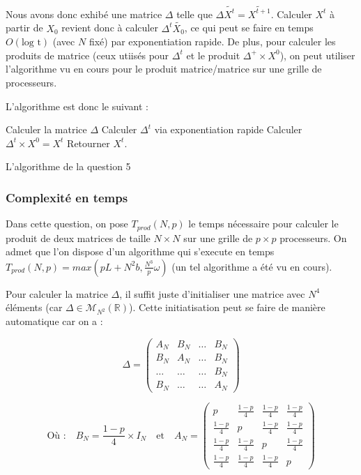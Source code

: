 \documentclass{article}
\begin{document}
Nous avons donc exhibé une matrice $\Delta$ telle que $\Delta \widetilde{X^t} = \widetilde{X^{t+1}}$. Calculer $X^t$ à partir de $X_0$ revient donc à calculer $\Delta^t \widetilde{X_0}$, ce qui peut se faire en temps $O(\text{log t})$ (avec $N$ fixé) par exponentiation rapide. De plus, pour calculer les produits de matrice (ceux utiisés pour $\Delta^t$ et le produit $\Delta^+ \times X^0$), on peut utiliser l'algorithme vu en cours pour le produit matrice/matrice sur une grille de processeurs.

L'algorithme est donc le suivant : \\

\begin{algorithm}[H]
  Calculer la matrice $\Delta$\;
  Calculer $\Delta^t$ via exponentiation rapide\;
  Calculer $\Delta^t \times X^0 = X^t$ \;
  Retourner $X^t$.
 \caption{L'algorithme de la question 5}
\end{algorithm}

\subsubsection*{Complexité en temps}

Dans cette question, on pose $T_{prod}(N,p)$ le temps nécessaire pour calculer le produit de deux matrices de taille $N \times N$ sur une grille de $p \times p$ processeurs. On admet que l'on dispose d'un algorithme qui s'execute en temps $T_{prod}(N,p) = max \left( pL + N^2 b, \frac{N^3}{p} \omega \right) $ (un tel algorithme a été vu en cours).

Pour calculer la matrice $\Delta$, il suffit juste d'initialiser une matrice avec $N^4$ éléments (car $\Delta \in \mathcal{M}_{N^2}(\mathbb{R})$). Cette initiatisation peut se faire de manière automatique car on a : 

$$ \Delta = 
	\left(\begin{array}{c|c|c|c}
    A_N & B_N & \dots & B_N  \\
	\hline
	B_N & A_N & \dots & B_N \\
	\hline
	\dots & \dots & \dots & B_N \\
	\hline
	B_N & \dots & \dots & A_N
	\end{array} \right)$$

$$ \text{Où :} \quad B_N = \frac{1-p}{4} \times I_N \quad \text{et} \quad A_N =
	\begin{pmatrix} p & \frac{1-p}{4} & \frac{1-p}{4} & \frac{1-p}{4} \\
					\frac{1-p}{4} & p & \frac{1-p}{4} & \frac{1-p}{4} \\
					\frac{1-p}{4} & \frac{1-p}{4} & p & \frac{1-p}{4} \\
					\frac{1-p}{4} & \frac{1-p}{4} & \frac{1-p}{4} & p
	 \end{pmatrix}  $$ \\
\end{document}
